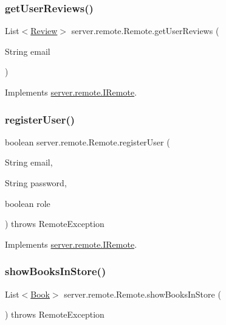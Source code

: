 \subsubsection{\texorpdfstring{get\+User\+Reviews()}{getUserReviews()}}
{\footnotesize\ttfamily List$<$\hyperlink{classserver_1_1data_1_1_review}{Review}$>$ server.\+remote.\+Remote.\+get\+User\+Reviews (\begin{DoxyParamCaption}\item[{String}]{email }\end{DoxyParamCaption})}



Implements \hyperlink{interfaceserver_1_1remote_1_1_i_remote_a9e52d282ba2386018ebd6817459a743f}{server.\+remote.\+I\+Remote}.

\mbox{\label{classserver_1_1remote_1_1_remote_ad3a381123e93a8e5ec26d84c4ff8b92f}} 
\subsubsection{\texorpdfstring{register\+User()}{registerUser()}}
{\footnotesize\ttfamily boolean server.\+remote.\+Remote.\+register\+User (\begin{DoxyParamCaption}\item[{String}]{email,  }\item[{String}]{password,  }\item[{boolean}]{role }\end{DoxyParamCaption}) throws Remote\+Exception}



Implements \hyperlink{interfaceserver_1_1remote_1_1_i_remote_a2e426f5eb58352993207ce0a24539f81}{server.\+remote.\+I\+Remote}.

\mbox{\label{classserver_1_1remote_1_1_remote_a131873c01bc4fe829dd7d2385c89ca87}} 
\subsubsection{\texorpdfstring{show\+Books\+In\+Store()}{showBooksInStore()}}
{\footnotesize\ttfamily List$<$\hyperlink{classserver_1_1data_1_1_book}{Book}$>$ server.\+remote.\+Remote.\+show\+Books\+In\+Store (\begin{DoxyParamCaption}{ }\end{DoxyParamCaption}) throws Remote\+Exception}



